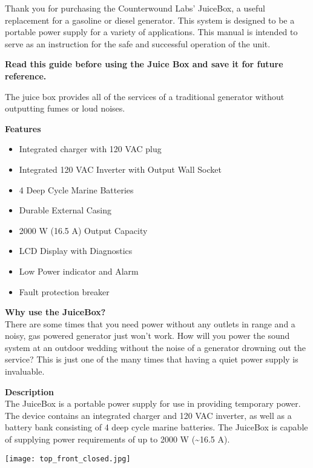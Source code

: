 \documentclass[../jb_user_manual.tex]{subfiles}
\begin{document}
\begin{flushleft}

\par Thank you for purchasing the Counterwound Labs' JuiceBox, a useful replacement for a gasoline or diesel generator. This system is designed to be a portable power supply for a variety of applications. This manual is intended to serve as an instruction for the safe and successful operation of the unit.

\vspace{4mm} 
\noindent 
\textbf{Read this guide before using the Juice Box and save it for future reference.}

\vspace{4mm}
The juice box provides all of the services of a traditional generator without outputting fumes or loud noises.

\vspace{6mm}
\begin{Large}
	\textbf{Features}
\end{Large}

\begin{itemize}
	\item{Integrated charger with 120 VAC plug}
	\item{Integrated 120 VAC Inverter with Output Wall Socket}
	\item{4 Deep Cycle Marine Batteries}
	\item{Durable External Casing}
	\item{2000 W (16.5 A) Output Capacity}
	\item{LCD Display with Diagnostics}
	\item{Low Power indicator and Alarm}
	\item{Fault protection breaker} 

\end{itemize}

\newpage

\textbf{Why use the JuiceBox?} \\
There are some times that you need power without any outlets in range and a noisy, gas powered generator just won't work. How will you power the sound system at an outdoor wedding without the noise of a generator drowning out the service? This is just one of the many times that having a quiet power supply is invaluable. 

\vspace{8mm}

\textbf{Description} \\
The JuiceBox is a portable power supply for use in providing temporary power.  The device contains an integrated charger and 120 VAC inverter, as well as a battery bank consisting of 4 deep cycle marine batteries.  The JuiceBox is capable of supplying power requirements of up to 2000 W (\~{}16.5 A).

\texttt{[image: top\_front\_closed.jpg]}

\end{flushleft}
\end{document}
